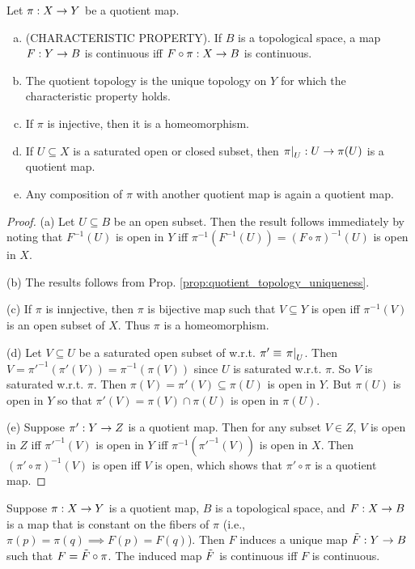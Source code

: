 \documentclass[11pt,a4paper]{article}
\begin{document}
\begin{prop} \label{prop:quotient_map_properties}
Let $\pi:X\rightarrow Y$ be a quotient map.
\begin{enumerate}[(a)]
    \item (CHARACTERISTIC PROPERTY). If $B$ is a topological space, a map $F:Y\rightarrow B$ is continuous iff $F\circ \pi:X\rightarrow B$ is continuous.
    \item The quotient topology is the unique topology on $Y$ for which the characteristic property holds.
    \item If $\pi$ is injective, then it is a homeomorphism.
    \item If $U\subseteq X$ is a saturated open or closed subset, then $\left.\pi\right|_{U}:U\rightarrow \pi(U)$ is a quotient map.
    \item Any composition of $\pi$ with another quotient map is again a quotient map.
\end{enumerate}
\end{prop}

\begin{proof}
(a) Let $U\subseteq B$ be an open subset. Then the result follows immediately by noting that $F^{-1}(U)$ is open in $Y$ iff $\pi^{-1}(F^{-1}(U)) = (F\circ \pi)^{-1}(U)$ is open in $X$.

(b) The results follows from Prop. \ref{prop:quotient_topology_uniqueness}.

(c) If $\pi$ is innjective, then $\pi$ is bijective map such that $V\subseteq Y$ is open iff $\pi^{-1}(V)$ is an open subset of $X$. Thus $\pi$ is a homeomorphism.

(d) Let $V\subseteq U$ be a saturated open subset of w.r.t. $\pi'\equiv \left.\pi\right|_{U}$. Then $V = \pi'^{-1}(\pi'(V)) = \pi^{-1}(\pi(V))$ since $U$ is saturated w.r.t. $\pi$. So $V$ is saturated w.r.t. $\pi$. Then $\pi(V) = \pi'(V)\subseteq \pi(U)$ is open in $Y$. But $\pi(U)$ is open in $Y$ so that $\pi'(V) = \pi(V)\cap \pi(U)$ is open in $\pi(U)$.

(e) Suppose $\pi':Y\rightarrow Z$ is a quotient map. Then for any subset $V\in Z$, $V$ is open in $Z$ iff $\pi'^{-1}(V)$ is open in $Y$ iff $\pi^{-1}(\pi'^{-1}(V))$ is open in $X$. Then $(\pi'\circ\pi)^{-1}(V)$ is open iff $V$ is open, which shows that $\pi'\circ \pi$ is a quotient map.
\end{proof}

\begin{prop}\label{prop:passing_to_the_quotient}
Suppose $\pi:X\rightarrow Y$ is a quotient map, $B$ is a topological space, and $F:X\rightarrow B$ is a map that is constant on the fibers of $\pi$ (i.e., $\pi(p) = \pi(q)\implies F(p)=F(q)$). Then $F$ induces a unique map $\Tilde{F}:Y\rightarrow B$ such that $F = \Tilde{F}\circ \pi$. The induced map $\Tilde{F}$ is continuous iff $F$ is continuous.
\end{prop}
\end{document}
